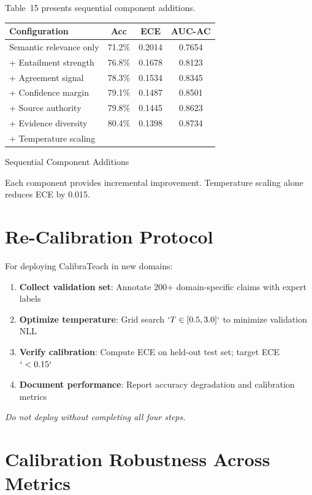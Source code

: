 Table~15 presents sequential component additions.

\protect{}\label{tab:ablation_extended}
{\def\LTcaptype{none} %
\begin{longtable}[]{@{}lccc@{}}
\toprule\noalign{}
\textbf{Configuration} & \textbf{Acc} & \textbf{ECE} & \textbf{AUC-AC} \\
\midrule\noalign{}
\endhead
\bottomrule\noalign{}
\endlastfoot
Semantic relevance only & 71.2\% & 0.2014 & 0.7654 \\
+ Entailment strength & 76.8\% & 0.1678 & 0.8123 \\
+ Agreement signal & 78.3\% & 0.1534 & 0.8345 \\
+ Confidence margin & 79.1\% & 0.1487 & 0.8501 \\
+ Source authority & 79.8\% & 0.1445 & 0.8623 \\
+ Evidence diversity & 80.4\% & 0.1398 & 0.8734 \\
+ Temperature scaling & & & \\
\end{longtable}
}

Sequential Component Additions

Each component provides incremental improvement. Temperature scaling alone reduces ECE by 0.015.

\section{Re-Calibration Protocol}\label{re-calibration-protocol}

For deploying CalibraTeach in new domains:

\begin{enumerate}
\def\labelenumi{\arabic{enumi}.}
\item
  \textbf{Collect validation set}: Annotate 200+ domain-specific claims with expert labels
\item
  \textbf{Optimize temperature}: Grid search \(`T \in [0.5, 3.0]`\) to minimize validation NLL
\item
  \textbf{Verify calibration}: Compute ECE on held-out test set; target ECE \(`<0.15`\)
\item
  \textbf{Document performance}: Report accuracy degradation and calibration metrics
\end{enumerate}

\emph{Do not deploy without completing all four steps.}

\section{Calibration Robustness Across Metrics}\label{calibration-robustness-across-metrics}

